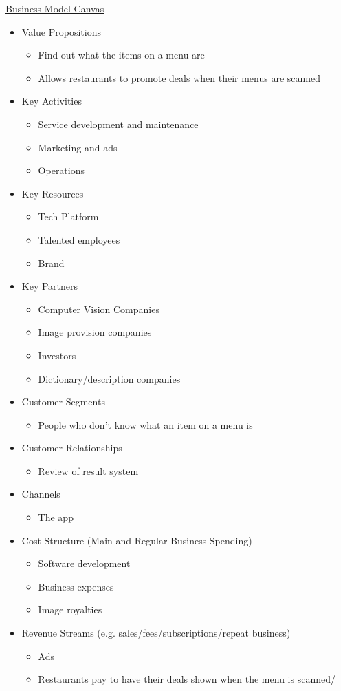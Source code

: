 \documentclass{article}[18pt]
\begin{document}
\begin{center}
\underline{\huge Business Model Canvas}
\end{center}
\begin{itemize}
	\item Value Propositions
	\begin{itemize}
		\item Find out what the items on a menu are
		\item Allows restaurants to promote deals when their menus are scanned
	\end{itemize}
	\item Key Activities
	\begin{itemize}
		\item Service development and maintenance
		\item Marketing and ads
		\item Operations
	\end{itemize}
	\item Key Resources
	\begin{itemize}
		\item Tech Platform
		\item Talented employees
		\item Brand
	\end{itemize}
	\item Key Partners
	\begin{itemize}
		\item Computer Vision Companies
		\item Image provision companies
		\item Investors
		\item Dictionary/description companies
	\end{itemize}
	\item Customer Segments
	\begin{itemize}
		\item People who don't know what an item on a menu is
	\end{itemize}
	\item Customer Relationships
	\begin{itemize}
		\item Review of result system
	\end{itemize}
	\item Channels
	\begin{itemize}
		\item The app
	\end{itemize}
	\item Cost Structure (Main and Regular Business Spending)
	\begin{itemize}
		\item Software development
		\item Business expenses
		\item Image royalties
	\end{itemize}
	\item Revenue Streams (e.g. sales/fees/subscriptions/repeat business)
	\begin{itemize}
		\item Ads
		\item Restaurants pay to have their deals shown when the menu is scanned/
	\end{itemize}
\end{itemize}
\end{document}
